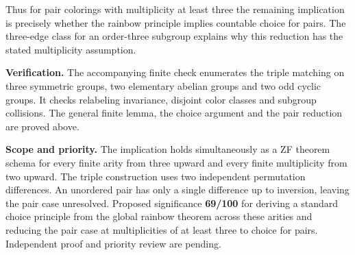 \documentclass[11pt]{article}
\begin{document}
Thus for pair colorings with multiplicity at least three the remaining implication is precisely whether the rainbow principle implies countable choice for pairs. The three-edge class for an order-three subgroup explains why this reduction has the stated multiplicity assumption.

\textbf{Verification.} The accompanying finite check enumerates the triple matching on three symmetric groups, two elementary abelian groups and two odd cyclic groups. It checks relabeling invariance, disjoint color classes and subgroup collisions. The general finite lemma, the choice argument and the pair reduction are proved above.

\textbf{Scope and priority.} The implication holds simultaneously as a ZF theorem schema for every finite arity from three upward and every finite multiplicity from two upward. The triple construction uses two independent permutation differences. An unordered pair has only a single difference up to inversion, leaving the pair case unresolved. Proposed significance \textbf{69/100} for deriving a standard choice principle from the global rainbow theorem across these arities and reducing the pair case at multiplicities of at least three to choice for pairs. Independent proof and priority review are pending.
\end{document}
